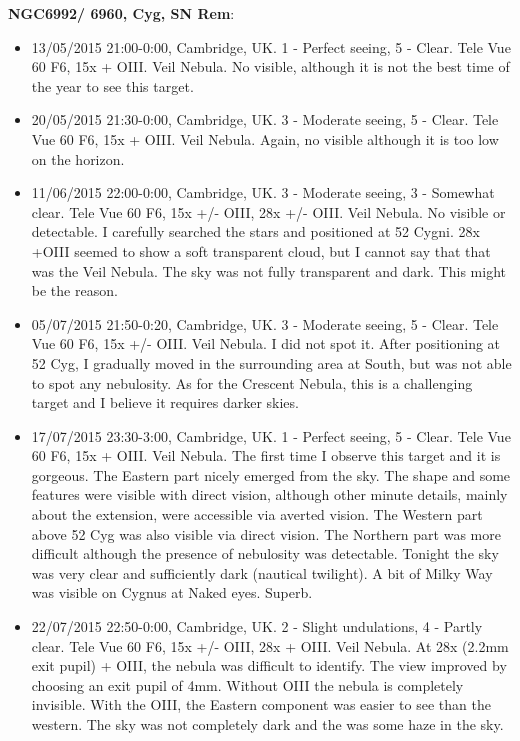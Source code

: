 {\bf NGC6992/ 6960, Cyg, SN Rem}:
\begin{itemize}
\item 13/05/2015 21:00-0:00, Cambridge, UK. 1 - Perfect seeing, 5 - Clear. Tele Vue 60 F6, 15x + OIII. Veil Nebula. No visible, although it is not the best time of the year to see this target.
\item 20/05/2015 21:30-0:00, Cambridge, UK. 3 - Moderate seeing, 5 - Clear. Tele Vue 60 F6, 15x + OIII. Veil Nebula. Again, no visible although it is too low on the horizon.
\item 11/06/2015 22:00-0:00, Cambridge, UK. 3 - Moderate seeing, 3 - Somewhat clear. Tele Vue 60 F6, 15x +/- OIII, 28x +/- OIII. Veil Nebula. No visible or detectable. I carefully searched the stars and positioned at 52 Cygni. 28x +OIII seemed to show a soft transparent cloud, but I cannot say that that was the Veil Nebula. The sky was not fully transparent and dark. This might be the reason.
\item 05/07/2015 21:50-0:20, Cambridge, UK. 3 - Moderate seeing, 5 - Clear. Tele Vue 60 F6, 15x +/- OIII. Veil Nebula. I did not spot it. After positioning at 52 Cyg, I gradually moved in the surrounding area at South, but was not able to spot any nebulosity. As for the Crescent Nebula, this is a challenging target and I believe it requires darker skies. 
\item 17/07/2015 23:30-3:00, Cambridge, UK. 1 - Perfect seeing, 5 - Clear. Tele Vue 60 F6, 15x + OIII. Veil Nebula. The first time I observe this target and it is gorgeous. The Eastern part nicely emerged from the sky. The shape and some features were visible with direct vision, although other minute details, mainly about the extension, were accessible via averted vision. The Western part above 52 Cyg was also visible via direct vision. The Northern part was more difficult although the presence of nebulosity was detectable. Tonight the sky was very clear and sufficiently dark (nautical twilight). A bit of Milky Way was visible on Cygnus at Naked eyes. Superb.
\item 22/07/2015 22:50-0:00, Cambridge, UK. 2 - Slight undulations, 4 - Partly clear. Tele Vue 60 F6, 15x +/- OIII, 28x + OIII. Veil Nebula. At 28x (2.2mm exit pupil) + OIII, the nebula was difficult to identify. The view improved by choosing an exit pupil of 4mm. Without OIII the nebula is completely invisible. With the OIII, the Eastern component was easier to see than the western. The sky was not completely dark and the was some haze in the sky.
\end{itemize}
